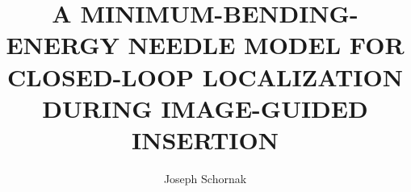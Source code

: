 \documentclass[12pt,letterpaper, oneside,final]{template/thesisClass}
\begin{document}
\title{A MINIMUM-BENDING-ENERGY NEEDLE MODEL FOR CLOSED-LOOP LOCALIZATION DURING IMAGE-GUIDED INSERTION}
\author{Joseph Schornak}
\dissertation
\doctorphilosophy
\copyrightnotice









\begin{spacing}{1}
\def\dsp{\def\baselinestretch{1.25}\large\normalsize}


\end{spacing}

%
\end{document}
